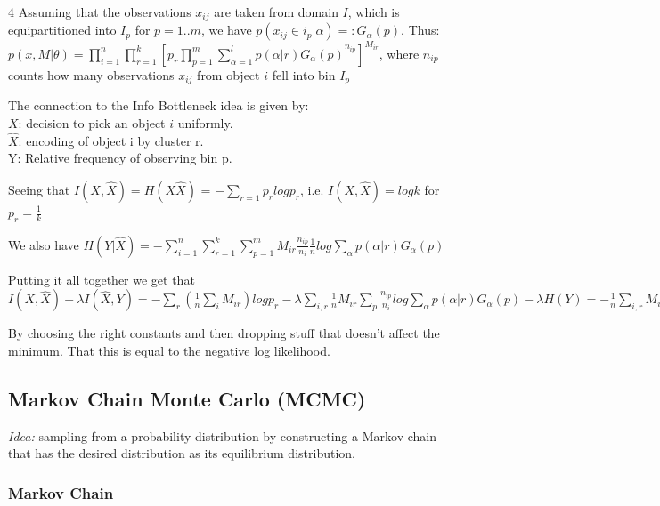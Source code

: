 \documentclass[9pt,parskip]{scrartcl}
\begin{document}
\begin{multicols*}{4}
Assuming that the observations $x_{ij}$ are taken from domain $I$, which is equipartitioned into $I_p$ for $p= 1..m$, we have $p(x_{ij} \in i_p|\alpha) =: G_{\alpha}(p)$.
Thus:
$p(x,M|\theta) = \prod_{i=1}^n \prod_{r=1}^k[p_r \prod_{p=1}^m {\sum_{\alpha = 1}^l p(\alpha | r)G_{\alpha }(p)}^{n_{ip}}]^{M_{ir}}$,
where $n_{ip}$ counts how many observations $x_{ij}$ from object $i$ fell into bin $I_p$

The connection to the Info Bottleneck idea is given by:\\
$X$: decision to pick an object $i$ uniformly.\\
$\hat X$: encoding of object i by cluster r. \\
Y: Relative frequency of observing bin p.

Seeing that $I(X,\hat X) = H(X\hat X)$ = $-\sum_{r=1} p_r log p_r$, i.e. $I(X,\hat X) = log k$ for $p_r = \frac{1}{k}$

We also have $H(Y|\hat X) = - \sum_{i=1}^n \sum_{r=1}^k \sum_{p=1}^m M_{ir} \frac{n_{ip}}{n_i}\frac{1}{n} log \sum_{\alpha} p(\alpha|r)G_{\alpha}(p)$

Putting it all together we get that $I(X,\hat X) - \lambda I(\hat X, Y) = - \sum_r (\frac{1}{n}\sum_i M_{ir}) log p_r - \lambda \sum_{i,r} \frac{1}{n} M_{ir} \sum_p \frac{n_{ip}}{n_i}log \sum_{\alpha} p(\alpha|r)G_{\alpha}(p) - \lambda H(Y)
= - \frac{1}{n} \sum_{i,r} M_{ir}[log p_r + \frac{\lambda}{n_i} \sum_p n_{ip} log \sum_{\alpha} p(\alpha|r)G_{\alpha}(p)] - \lambda H(Y)$

By choosing the right constants and then dropping stuff that doesn't affect the minimum. That this is equal to the negative log likelihood. 

\subsection*{Markov Chain Monte Carlo (MCMC)}
\textit{Idea:} sampling from a probability distribution by constructing a Markov chain that has the desired distribution as its equilibrium distribution. 

\subsubsection*{Markov Chain}


\end{multicols*}
\end{document}
